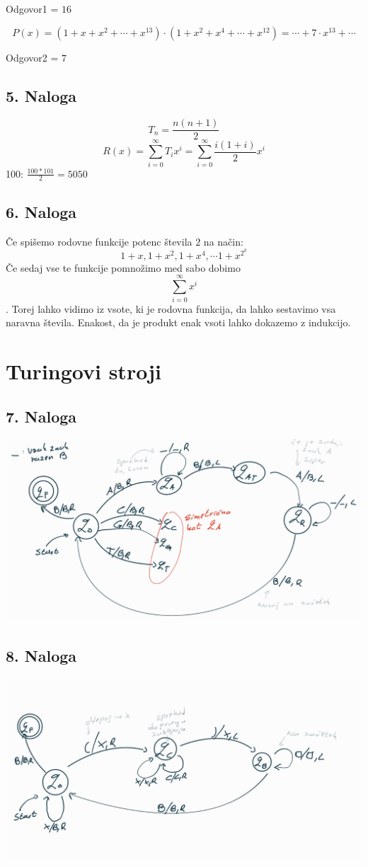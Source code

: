 \documentclass[a4paper,12pt]{article}
\begin{document}
Odgovor1 = $16$

$$P(x) = (1+x + x^2 + \cdots + x^{13}) \cdot (1+x^2 + x^4 + \cdots + x^{12}) = \cdots + \boxed{7} \cdot x^{13} + \cdots$$

Odgovor2 = $7$

\subsection{5. Naloga}
$$T_n=\frac{n(n+1)}{2}$$
$$R(x) = \sum_{i=0}^{\infty} T_i x^i = \sum_{i=0}^{\infty} \frac{i(1+i)}{2} x^i  $$
100: $ \frac{100 * 101}{2} = 5050 $

\subsection{6. Naloga}
Če spišemo rodovne funkcije potenc števila $2$ na način:
$$1+x, 1+x^2, 1+x^4, \cdots 1+x^{2^k}$$
Če sedaj vse te funkcije pomnožimo med sabo dobimo $$\sum_{i=0}^{\infty} x^i $$.
Torej lahko vidimo iz vsote, ki je rodovna funkcija, da lahko sestavimo vsa naravna števila.
Enakost, da je produkt enak vsoti lahko dokazemo z indukcijo.

\section{Turingovi stroji}
\subsection{7. Naloga}
\includegraphics[width=\textwidth]{sedma.png}

\subsection{8. Naloga}
\includegraphics[width=\textwidth]{osma.png}
\end{document}
